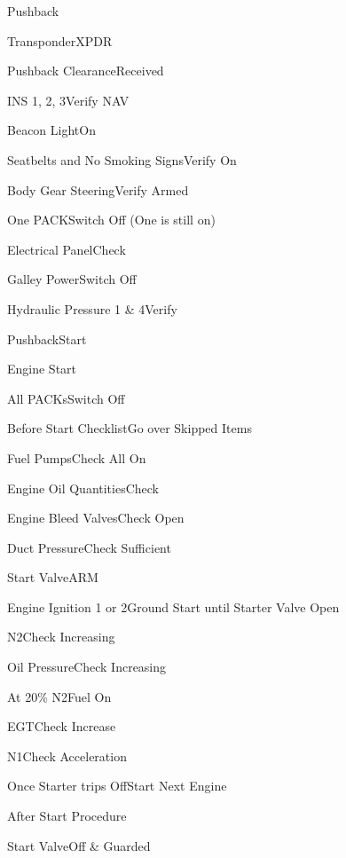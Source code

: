 \documentclass[sim-use, blue_items]{checklist}
\begin{document}
\begin{checklist}{Pushback}
	\item{Transponder}{XPDR}
	\item{Pushback Clearance}{Received}
	\item{INS 1, 2, 3}{Verify NAV}
	\item{Beacon Light}{On}
	\item{Seatbelts and No Smoking Signs}{Verify On}
	\item{Body Gear Steering}{Verify Armed}
	\item{One PACK}{Switch Off (One is still on)}
	\item{Electrical Panel}{Check}
	\item{Galley Power}{Switch Off}
	\item{Hydraulic Pressure 1 \& 4}{Verify}
	\item{Pushback}{Start}
\end{checklist}

\begin{checklist}{Engine Start}
	\item{All PACKs}{Switch Off}
	\item{Before Start Checklist}{Go over Skipped Items}
	\item{Fuel Pumps}{Check All On}
	\item{Engine Oil Quantities}{Check}
	\item{Engine Bleed Valves}{Check Open}
	\item{Duct Pressure}{Check Sufficient}
	\item{Start Valve}{ARM}
	 {
		\item{Engine Ignition 1 or 2}{Ground Start until Starter Valve Open}
		\item{N2}{Check Increasing}
		\item{Oil Pressure}{Check Increasing}
		\item{At 20\% N2}{Fuel On}
		\item{EGT}{Check Increase}
		\item{N1}{Check Acceleration}
		\item{Once Starter trips Off}{Start Next Engine}
	}
\end{checklist}

\begin{checklist}{After Start Procedure}
	\item{Start Valve}{Off \& Guarded}
\end{checklist}
\end{document}
